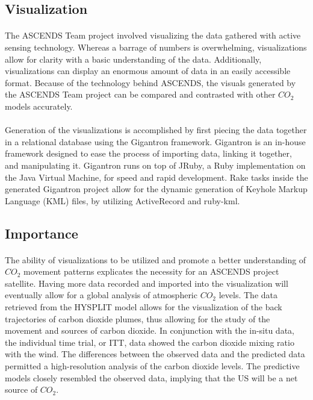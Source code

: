 \documentclass[12pt,letterpaper]{report}
\begin{document}
  \subsection*{Visualization}
   \paragraph{}
    The ASCENDS Team project involved visualizing the data gathered with active sensing technology. Whereas a barrage of numbers is overwhelming, visualizations allow for clarity with a basic understanding of the data. Additionally, visualizations can display an enormous amount of data in an easily accessible format. Because of the technology behind ASCENDS, the visuals generated by the ASCENDS Team project can be compared and contrasted with other $CO_2$ models accurately.
   \paragraph{}
    Generation of the visualizations is accomplished by first piecing the data together in a relational database using the Gigantron framework. Gigantron is an in-house framework designed to ease the process of importing data, linking it together, and manipulating it. Gigantron runs on top of JRuby, a Ruby implementation on the Java Virtual Machine, for speed and rapid development. Rake tasks inside the generated Gigantron project allow for the dynamic generation of Keyhole Markup Language (KML) files, by utilizing ActiveRecord and ruby-kml.
  \subsection*{Importance}
   \paragraph{}
    The ability of visualizations to be utilized and promote a better understanding of $CO_2$ movement patterns explicates the necessity for an ASCENDS project satellite. Having more data recorded and imported into the visualization will eventually allow for a global analysis of atmospheric $CO_2$ levels. The data retrieved from the HYSPLIT model allows for the visualization of the back trajectories of carbon dioxide plumes, thus allowing for the study of the movement and sources of carbon dioxide. In conjunction with the in-situ data, the individual time trial, or ITT, data showed the carbon dioxide mixing ratio with the wind. The differences between the observed data and the predicted data permitted a high-resolution analysis of the carbon dioxide levels. The predictive models closely resembled the observed data, implying that the US will be a net source of $CO_2$.
\end{document}
